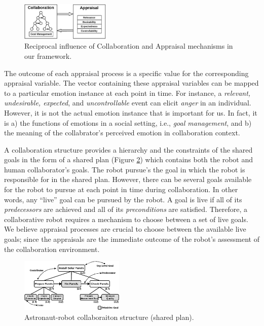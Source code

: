 \documentclass[conference]{IEEEtran}
\begin{document}
\vspace*{-3mm}
\begin{figure}[tbh]
  \centering
  \includegraphics[width=0.38\textwidth]{figure/ActionSelection-croped.pdf}
  \vspace*{-2mm}
  \caption{{\fontsize{9}{9}\selectfont Reciprocal influence of Collaboration
  and Appraisal mechanisms in our framework.}}
  \label{fig:actionSelection}
  \vspace*{-2mm}
\end{figure}

The outcome of each appraisal process is a specific value for the corresponding
appraisal variable. The vector containing these appraisal variables can be
mapped to a particular emotion instance at each point in time. For instance, a
\textit{relevant, undesirable, expected}, and \textit{uncontrollable} event can
elicit \textit{anger} in an individual. However, it is not the actual emotion
instance that is important for us. In fact, it is a) the functions of emotions
in a social setting, i.e., \textit{goal management}, and b) the meaning of
the collabrator's perceived emotion in collaboration context.

A collaboration structure provides a hierarchy and the constraints of the shared
goals in the form of a shared plan (Figure \ref{fig:taskModel}) which contains
both the robot and human collaborator's goals. The robot pursue's the goal in
which the robot is responsible for in the shared plan. However, there can be
several goals available for the robot to pursue at each point in time during
collaboration. In other words, any ``live'' goal can be pursued by the robot. A
goal is live if all of its \textit{predecessors} are achieved and all of its
\textit{preconditions} are satisfied. Therefore, a collaborative robot requires
a mechanism to choose between a set of live goals. We believe appraisal
processes are crucial to choose between the available live goals; since the
appraisals are the immediate outcome of the robot's assessment of the
collaboration environment.

\begin{figure}[tbh]
  \centering
  \includegraphics[width=0.44\textwidth]{figure/collaborationStructure-croped.pdf}
  \vspace*{-3mm}
  \caption{{\fontsize{9}{9}\selectfont Astronaut-robot collaboraiton structure
  (shared plan).}}
  \label{fig:taskModel}
  \vspace*{-9mm}
\end{figure}
\end{document}

